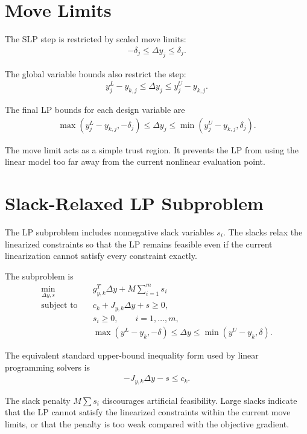 \documentclass[11pt,a4paper]{article}
\begin{document}
\section{Move Limits}

The SLP step is restricted by scaled move limits:
\begin{align}
    -\delta_j \leq \Delta y_j \leq \delta_j.
\end{align}

The global variable bounds also restrict the step:
\begin{align}
    y^L_j - y_{k,j} \leq \Delta y_j \leq y^U_j - y_{k,j}.
\end{align}

The final LP bounds for each design variable are
\begin{align}
    \max(y^L_j - y_{k,j}, -\delta_j)
    \leq
    \Delta y_j
    \leq
    \min(y^U_j - y_{k,j}, \delta_j).
\end{align}

The move limit acts as a simple trust region. It prevents the LP from using the
linear model too far away from the current nonlinear evaluation point.

\section{Slack-Relaxed LP Subproblem}

The LP subproblem includes nonnegative slack variables \(s_i\). The slacks relax
the linearized constraints so that the LP remains feasible even if the current
linearization cannot satisfy every constraint exactly.

The subproblem is
\begin{align}
    \min_{\Delta y, s} \quad
        & g_{y,k}^T \Delta y + M \sum_{i=1}^{m} s_i \\
    \text{subject to} \quad
        & c_k + J_{y,k}\Delta y + s \geq 0, \\
        & s_i \geq 0, \qquad i = 1,\dots,m, \\
        & \max(y^L - y_k, -\delta)
          \leq \Delta y \leq
          \min(y^U - y_k, \delta).
\end{align}

The equivalent standard upper-bound inequality form used by linear programming
solvers is
\begin{align}
    -J_{y,k}\Delta y - s \leq c_k.
\end{align}

The slack penalty \(M\sum s_i\) discourages artificial feasibility. Large slacks
indicate that the LP cannot satisfy the linearized constraints within the
current move limits, or that the penalty is too weak compared with the objective
gradient.
\end{document}
